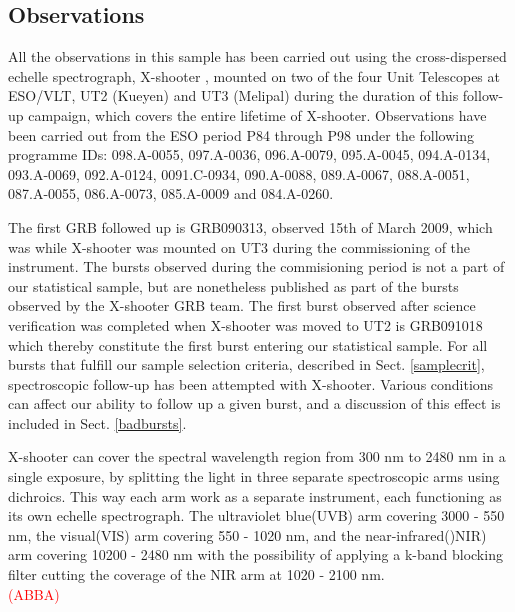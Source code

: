 \documentclass{aa}    %
\newcommand\todo[1]{\textcolor{red}{(#1)}}
\begin{document}
\subsection{Observations} \label{obs}

All the observations in this sample has been carried out using the
cross-dispersed echelle spectrograph, X-shooter \citep{Vernet2011}, mounted on
two of the four Unit Telescopes at ESO/VLT, UT2 (Kueyen) and UT3 (Melipal)
during the duration of this follow-up campaign, which covers the entire lifetime
of X-shooter. Observations have been carried out from the ESO period P84
through P98 under the following programme IDs: 098.A-0055, 097.A-0036, 096.A-0079,
095.A-0045, 094.A-0134, 093.A-0069, 092.A-0124, 0091.C-0934, 090.A-0088,
089.A-0067, 088.A-0051, 087.A-0055, 086.A-0073, 085.A-0009 and 084.A-0260. 

The first GRB followed up is GRB090313, observed 15th of March 2009, which was
while X-shooter was mounted on UT3 during the commissioning of the instrument.
The bursts observed during the commisioning period is not a part of our
statistical sample, but are nonetheless published as part of the bursts observed
by the X-shooter GRB team. The first burst observed after science verification
was completed when X-shooter was moved to UT2 is GRB091018 which thereby
constitute the first burst entering our statistical sample. For all bursts that
fulfill our sample selection criteria, described in Sect. \ref{samplecrit},
spectroscopic follow-up has been attempted with X-shooter. Various conditions
can affect our ability to follow up a given burst, and a discussion of this
effect is included in Sect. \ref{badbursts}.

X-shooter can cover the spectral wavelength region from 300 nm to 2480
nm in a single exposure, by splitting the light in three separate
spectroscopic arms using dichroics.  This way each arm work as a separate
instrument, each functioning as its own echelle spectrograph.  The ultraviolet
blue(UVB) arm covering 3000 - 550 nm, the visual(VIS) arm covering 550 -
1020 nm, and the near-infrared()NIR) arm covering 10200 - 2480 nm with the
possibility of applying a k-band blocking filter cutting the coverage of the
NIR arm at 1020 - 2100 nm.
\\

\todo{ABBA}
\end{document}
